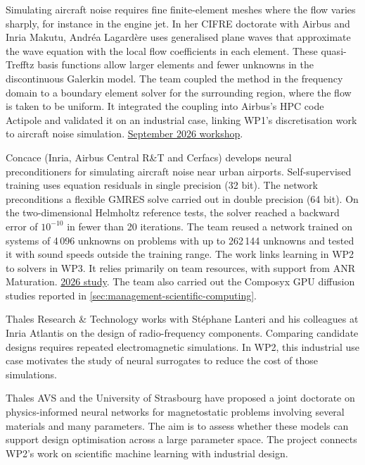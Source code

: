 Simulating aircraft noise requires fine finite-element meshes where
the flow varies sharply, for instance in the engine jet.
In her CIFRE doctorate with Airbus and Inria Makutu, Andréa Lagardère
uses generalised plane waves that approximate the wave equation
with the local flow coefficients in each element. These
quasi-Trefftz basis functions allow larger elements and fewer
unknowns in the discontinuous Galerkin model. The team coupled the
method in the frequency domain to a boundary element solver for
the surrounding region, where the flow is taken to be uniform.
It integrated the coupling into Airbus's HPC code Actipole and
validated it on an industrial case, linking WP1's discretisation
work to aircraft noise simulation.
\href{https://trefftz2026.univie.ac.at/}{September 2026 workshop}.

Concace (Inria, Airbus Central R\&T and Cerfacs) develops neural
preconditioners for simulating aircraft noise near urban airports.
Self-supervised training uses equation residuals in single precision
(32 bit). The network preconditions a flexible GMRES solve carried
out in double precision (64 bit). On the two-dimensional Helmholtz reference
tests, the solver reached a backward error of $10^{-10}$ in fewer
than 20 iterations. The team reused a network trained on systems
of 4\,096 unknowns on problems with up to 262\,144 unknowns and tested
it with sound speeds outside the training range. The work links
learning in WP2 to solvers in WP3. It relies primarily on team
resources, with support from ANR Maturation.
\href{https://arxiv.org/abs/2610.16542}{2026 study}.
The team also carried out the Composyx GPU diffusion studies
reported in \cref{sec:management-scientific-computing}.

Thales Research \& Technology works with Stéphane Lanteri and his
colleagues at Inria Atlantis on the design of radio-frequency
components. Comparing candidate designs requires repeated
electromagnetic simulations. In WP2, this industrial use case
motivates the study of neural surrogates to reduce the cost of those
simulations.

Thales AVS and the University of Strasbourg have proposed a joint
doctorate on physics-informed neural networks for magnetostatic
problems involving several materials and many parameters. The aim is
to assess whether these models can support design optimisation across
a large parameter space. The project connects WP2's work on scientific
machine learning with industrial design.

